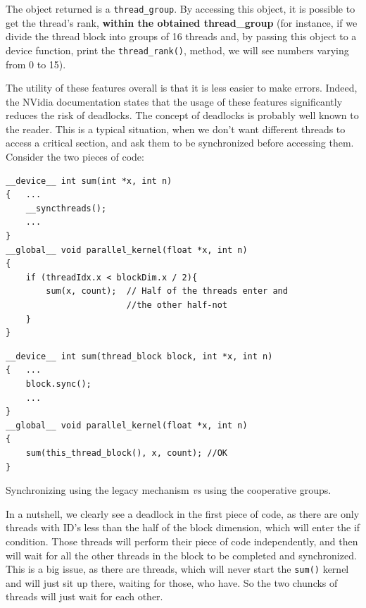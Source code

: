 The object returned is a \verb|thread_group|. By accessing this object, it is possible to get 
the thread's rank, \textbf{within the obtained thread\_group} (for instance, if we divide 
the thread block into groups of 16 threads and, by passing this object to a device function,
print the \verb|thread_rank()|, method, we will see numbers varying from 0 to 15). 

The utility of these features overall is that it is less easier to make errors. Indeed, 
the NVidia documentation states that the usage of these features significantly reduces the 
risk of deadlocks. The concept of deadlocks is probably well known to the reader. This is 
a typical situation, when we don't want different threads to access a critical section, and 
ask them to be synchronized before accessing them. Consider the two pieces of code:

\begin{listing}[!ht]
\begin{verbatim}
__device__ int sum(int *x, int n) 
{   ...
    __syncthreads();
    ...
}
__global__ void parallel_kernel(float *x, int n)
{
    if (threadIdx.x < blockDim.x / 2){
        sum(x, count);  // Half of the threads enter and 
                        //the other half-not
    }                   
}
\end{verbatim}
\caption*{}
\label{deadlock}

\begin{verbatim}
__device__ int sum(thread_block block, int *x, int n) 
{   ...
    block.sync();
    ...
}
__global__ void parallel_kernel(float *x, int n)
{
    sum(this_thread_block(), x, count); //OK
}
\end{verbatim}
    \caption{Synchronizing using the legacy mechanism \textit{vs} using the cooperative groups. \cite{blog_2020}}
\label{nodeadlock}
\end{listing}

\newpage
In a nutshell, we clearly see a deadlock in the first piece of code, as 
there are only threads with ID's less than the half of the block dimension, which will 
enter the if condition. Those threads will perform their piece of code independently, 
and then will wait for all the other threads in the block to be completed and 
synchronized. This is a big issue, as there are threads, which will never start the \verb|sum()|
kernel and will just sit up there, waiting for those, who have. So the two chuncks of threads
will just wait for each other. 

